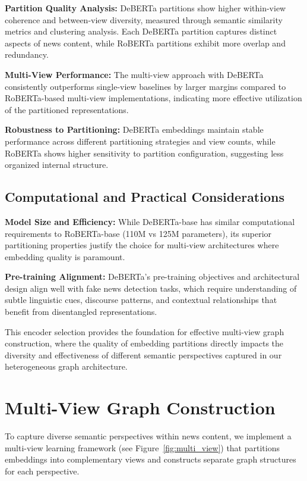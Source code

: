 \textbf{Partition Quality Analysis:} DeBERTa partitions show higher within-view coherence and between-view diversity, measured through semantic similarity metrics and clustering analysis. Each DeBERTa partition captures distinct aspects of news content, while RoBERTa partitions exhibit more overlap and redundancy.

\textbf{Multi-View Performance:} The multi-view approach with DeBERTa consistently outperforms single-view baselines by larger margins compared to RoBERTa-based multi-view implementations, indicating more effective utilization of the partitioned representations.

\textbf{Robustness to Partitioning:} DeBERTa embeddings maintain stable performance across different partitioning strategies and view counts, while RoBERTa shows higher sensitivity to partition configuration, suggesting less organized internal structure.

\subsection{Computational and Practical Considerations}

\textbf{Model Size and Efficiency:} While DeBERTa-base has similar computational requirements to RoBERTa-base (110M vs 125M parameters), its superior partitioning properties justify the choice for multi-view architectures where embedding quality is paramount.

\textbf{Pre-training Alignment:} DeBERTa's pre-training objectives and architectural design align well with fake news detection tasks, which require understanding of subtle linguistic cues, discourse patterns, and contextual relationships that benefit from disentangled representations.

This encoder selection provides the foundation for effective multi-view graph construction, where the quality of embedding partitions directly impacts the diversity and effectiveness of different semantic perspectives captured in our heterogeneous graph architecture.

\section{Multi-View Graph Construction}

To capture diverse semantic perspectives within news content, we implement a multi-view learning framework (see Figure~\ref{fig:multi_view}) that partitions embeddings into complementary views and constructs separate graph structures for each perspective.

